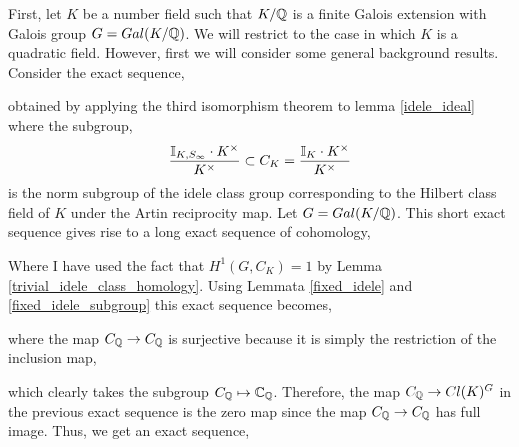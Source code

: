 \documentclass[12pt]{extarticle}
\begin{document}
First, let $K$ be a number field such that $K / \mathbb{Q}$ is a finite Galois extension with Galois group $G = Gal \small(K / \mathbb{Q} \small)$. We will restrict to the case in which $K$ is a quadratic field. However, first we will consider some general background results. 
\bigskip\\
Consider the exact sequence,
\begin{center}
\end{center}
obtained by applying the third isomorphism theorem to lemma \ref{idele_ideal} where the subgroup,
\[ \frac{\mathbb{I}_{K, S_{\infty}} \cdot K^\times}{K^\times} \subset C_K = \frac{ \mathbb{I}_{K} \cdot K^\times }{K^\times} \]
is the norm subgroup of the idele class group corresponding to the Hilbert class field of $K$ under the Artin reciprocity map. Let $G = Gal \small(K/\mathbb{Q} \small)$. This short exact sequence gives rise to a long exact sequence of cohomology,
\begin{center}
\end{center}
Where I have used the fact that $H^1(G, C_K) = 1$ by Lemma \ref{trivial_idele_class_homology}. Using Lemmata \ref{fixed_idele} and \ref{fixed_idele_subgroup} this exact sequence becomes,
\begin{center}
\end{center}
where the map $C_{\mathbb{Q}} \rightarrow C_{\mathbb{Q}}$ is surjective because it is simply the restriction of the inclusion map,
\begin{center}
\end{center}
which clearly takes the subgroup $C_{\mathbb{Q}} \mapsto \mathbb{C}_{\mathbb{Q}}$. Therefore, the map $C_{\mathbb{Q}} \to Cl(K)^G$ in the previous exact sequence is the zero map since the map $C_{\mathbb{Q}} \rightarrow C_{\mathbb{Q}}$ has full image. Thus, we get an exact sequence,
\end{document}
